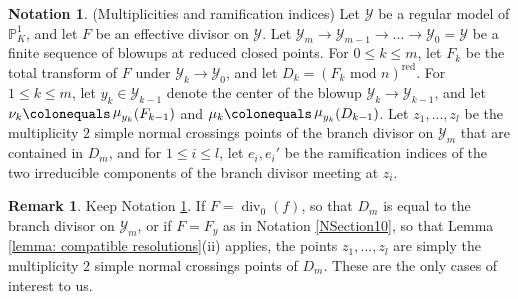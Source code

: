 \documentclass[12pt]{amsart}
\numberwithin{equation}{section}
\theoremstyle{definition}
\newtheorem{remark}[equation]{Remark}
\newtheorem{notation}[equation]{Notation}
\newcommand{\connor}[1]{{\color{Orange} \sf $\diamondsuit\diamondsuit\diamondsuit$ Connor: [#1]}}
\renewcommand{\P}{\mathbb P}
\newcommand{\Y}{\mathcal{Y}}
\newcommand{\tx}[1]{\text{#1}}
\DeclareMathOperator{\divi}{div}
\DeclareMathOperator{\red}{red}
\DeclareMathOperator{\HJL}{HJL}
\DeclareMathOperator{\mult}{\mu}
\begin{document}
\begin{notation}\label{not:multiplicities}(Multiplicities and ramification indices)  Let $\Y$ be a regular model of $\P^1_K$, and let $F$ be an effective divisor on $\Y$. %
    Let $\Y_m\to\Y_{m-1}\to...\to\Y_0=\Y$ be a finite sequence of blowups at reduced closed points. For $0\leq k\leq m$, let $F_k$ be the total transform of $F$ under $\Y_k\to\Y_0$, and let $D_k=(F_k\tx{ mod }n)^{\red}$. For $1\leq k\leq m$, let $y_k\in\Y_{k-1}$ denote the center of the blowup $\Y_k\to\Y_{k-1}$, and let $\nu_k \colonequals \mult_{y_k} (F_{k-1})$ and 
    $\mu_k \colonequals \mult_{y_k} (D_{k-1})$. 
    Let $z_1,...,z_l$ be the multiplicity $2$ simple normal crossings points of the branch divisor on $\Y_m$ that are contained in $D_m$, and for $1\leq i\leq l$, let $e_i,e_i'$ be the ramification indices of the two irreducible components of the branch divisor meeting at $z_i$.
\end{notation}

\begin{remark}
    Keep Notation \ref{not:multiplicities}. If $F=\divi_0(f)$, so that $D_m$ is equal to the branch divisor on $\Y_m$, or if $F=F_y$ as in Notation \ref{NSection10}, so that Lemma \ref{lemma: compatible resolutions}(ii) applies, the points $z_1,...,z_l$ are simply the multiplicity $2$ simple normal crossings points of $D_m$. These are the only cases of interest to us.
\end{remark}
\end{document}
